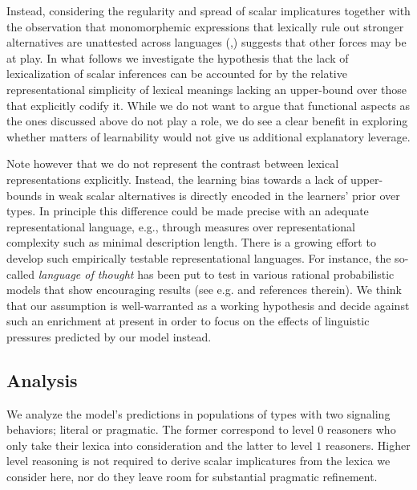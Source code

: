 \documentclass[a4paper]{article}
\begin{document}
Instead, considering the regularity and spread of scalar implicatures together with the observation that monomorphemic expressions that lexically rule out stronger alternatives are unattested across languages (\citealt[252-267]{horn:1984},\citealt{horn:1972,traugott:2004,vdAuwera:2010}) suggests that other forces may be at play. In what follows we investigate the hypothesis that the lack of lexicalization of scalar inferences can be accounted for by the relative representational simplicity of lexical meanings lacking an upper-bound over those that explicitly codify it. While we do not want to argue that functional aspects as the ones discussed above do not play a role, we do see a clear benefit in exploring whether matters of learnability would not give us additional explanatory leverage.


Note however that we do not represent the contrast between lexical representations explicitly. Instead, the learning bias towards a lack of upper-bounds in weak scalar alternatives is directly encoded in the learners' prior over types. In principle this difference could be made precise with an adequate representational language, e.g., through measures over representational complexity such as minimal description length.  There is a growing effort to develop such empirically  testable  representational  languages. For  instance, the so-called {\em language of thought} has been put to test in various rational probabilistic models that show encouraging results (see e.g. \citealt{katz+etal:2008, piantadosi+etal:underreview, piantadosi+etal:2012a} and references therein). We think that our assumption is well-warranted as a working hypothesis and decide against such an enrichment at present in order to focus on the effects of linguistic pressures predicted by our model instead. 
 

\subsection{Analysis}
We analyze the model's predictions in populations of types with two signaling behaviors; literal or pragmatic. The former correspond to level $0$ reasoners who only take their lexica into consideration and the latter to level $1$ reasoners. Higher level reasoning is not required to derive scalar implicatures from the lexica we consider here, nor do they leave room for substantial pragmatic refinement.
\end{document}
